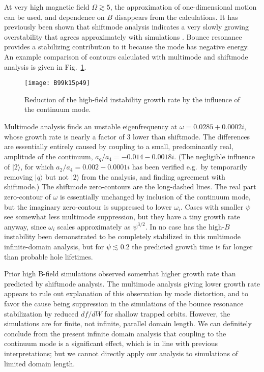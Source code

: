 \documentclass{jpp}
\def\ket#1{|#1\rangle}
\begin{document}
At very high magnetic field $\Omega\gtrsim5$, the approximation of
one-dimensional motion can be used, and dependence on $B$ disappears
from the calculations. It has previously been shown that shiftmode
analysis indicates a very slowly growing overstability that agrees
approximately with simulations
\citep{Hutchinson2019a}. Bounce resonance provides a stabilizing
contribution to it because the mode has negative energy.  An example
comparison of contours calculated with multimode and shiftmode
analysis is given in Fig.\ \ref{hiB}.
\begin{figure}
  \center  \texttt{[image: B99k15p49]}
  \caption{Reduction of the high-field instability growth rate by the
    influence of the continuum mode.\label{hiB}}
\end{figure}
Multimode analysis finds an unstable eigenfrequency at
$\omega=0.0285+0.0002i$, whose growth rate is nearly a factor of 3
lower than shiftmode.  The differences are essentially entirely caused
by coupling to a small, predominantly real, amplitude of the
continuum, $a_q/a_4=-0.014-0.0018i$. (The negligible influence of
$\ket{2}$, for which $a_2/a_4=0.002-0.0001i$ has been verified e.g.\
by temporarily removing $\ket{q}$ but not $\ket{2}$ from the analysis,
and finding agreement with shiftmode.)  The shiftmode zero-contours
are the long-dashed lines. The real part zero-contour of $\omega$ is
essentially unchanged by inclusion of the continuum mode, but the
imaginary zero-contour is suppressed to lower $\omega_i$. Cases with
smaller $\psi$ see somewhat less multimode suppression, but they
have a tiny growth rate anyway, since
$\omega_i$ scales approximately as $\psi^{3/2}$.  In no case has the
high-$B$ instability been demonstrated to be completely stabilized in this
multimode infinite-domain analysis, but for $\psi\lesssim0.2$ the
predicted growth time is far longer than probable hole lifetimes.

Prior high B-field simulations observed somewhat higher growth rate
than predicted by shiftmode analysis.  The multimode analysis giving
lower growth rate appears to rule out explanation of this observation
by mode distortion, and to favor the cause being suppression in the
simulations of the bounce resonance stabilization by reduced $df/dW$
for shallow trapped orbits. However, the simulations are for finite,
not infinite, parallel domain length.  We can definitely conclude from
the present infinite domain analysis that coupling to the continuum
mode is a significant effect, which is in line with previous
interpretations; but we cannot directly apply our analysis to
simulations of limited domain length.
\end{document}
